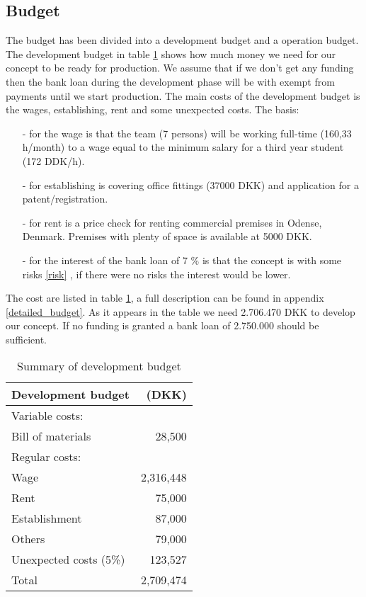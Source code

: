 \subsection{Budget}
\label{budget_label}
The budget has been divided into a development budget and a operation budget. 
The development budget in table \ref{devbud} shows how much money we need for our concept to be ready for production. 
We assume that if we don't get any funding then the bank loan during the development phase will be with exempt from payments until we start production. 
The main costs of the development budget is the wages, establishing, rent and some unexpected costs. 
The basis: \begin{itemize}
\item[-] for the wage is that the team (7 persons) will be working full-time (160,33 h/month) to a wage equal to the minimum salary for a third year student (172 DDK/h\cite{ida-salary}).
\item[-] for establishing is covering office fittings (37000 DKK) and application for a patent/registration.
\item[-] for rent is a price check for renting commercial premises in Odense, Denmark. Premises with plenty of space is available at 5000 DKK.\cite{rent_prices}
\item[-] for the interest of the bank loan of 7 \% is that the concept is with some risks \ref{risk} , if there were no risks the interest would be lower. 
\end{itemize} 
The cost are listed in table \ref{devbud}, a full description can be found in appendix \ref{detailed_budget}. As it appears in the table we need 2.706.470 DKK to develop our concept. If no funding is granted a bank loan of 2.750.000 should be sufficient.

\begin{table}[h!]
\centering
\begin{tabular}{l r}
Development budget      & (DKK)              \\
\hline                                       
Variable costs:         &                    \\
Bill of materials       &    28,500        \\
Regular costs:          &                           \\
Wage                    &    2,316,448           \\
Rent                    &    75,000        \\
Establishment           &    87,000        \\
Others                  &    79,000        \\
Unexpected costs (5\%)  &    123,527         \\
\hline                      
Total                   &    2,709,474           \\
\end{tabular}
\caption{Summary of development budget}
\label{devbud}
\end{table}

